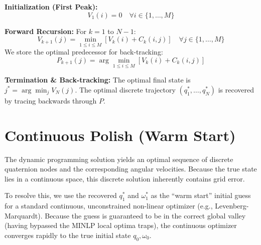\documentclass{article}
\begin{document}
\textbf{Initialization (First Peak):}
\begin{equation}
    V_1(i) = 0 \quad \forall i \in \{1, \dots, M\}
\end{equation}

\textbf{Forward Recursion:}
For $k = 1$ to $N-1$:
\begin{equation}
    V_{k+1}(j) = \min_{1 \le i \le M} \left[ V_k(i) + C_k(i, j) \right] \quad \forall j \in \{1, \dots, M\}
\end{equation}
We store the optimal predecessor for back-tracking:
\begin{equation}
    P_{k+1}(j) = \arg\min_{1 \le i \le M} \left[ V_k(i) + C_k(i, j) \right]
\end{equation}

\textbf{Termination \& Back-tracking:}
The optimal final state is $j^* = \arg\min_j V_N(j)$. The optimal discrete trajectory $(q_1^*, \dots, q_N^*)$ is recovered by tracing backwards through $P$.

\section{Continuous Polish (Warm Start)}
The dynamic programming solution yields an optimal sequence of discrete quaternion nodes and the corresponding angular velocities. Because the true state lies in a continuous space, this discrete solution inherently contains grid error. 

To resolve this, we use the recovered $q_1^*$ and $\omega_1^*$ as the ``warm start'' initial guess for a standard continuous, unconstrained non-linear optimizer (e.g., Levenberg-Marquardt). Because the guess is guaranteed to be in the correct global valley (having bypassed the MINLP local optima traps), the continuous optimizer converges rapidly to the true initial state $q_0, \omega_0$.
\end{document}
